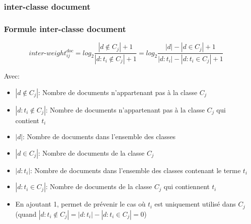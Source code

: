 \documentclass[12pt]{beamer}
\begin{document}
\begin{frame}
\subsubsection*{inter-classe document}
\frametitle{Formule inter-classe document}
 \begin{small}
 

\[ inter\mbox{-}weight_{ij}^{doc} = log_2 \frac{|d \notin{C_j}|+1}{|d:t_i \notin{C_j}|+1}= log_2 \frac{|d|-|d \in{C_j}|+1}{|d:t_i|-|d:t_i \in{C_j}|+1}\]
 \end{small}
 Avec:
 \begin{tiny}
\begin{itemize}
	\item $|d \notin  {C_j}|$: Nombre de documents n'appartenant pas à la classe $C_j$
	\item $|d:t_i \notin {C_j}|$: Nombre de documents n'appartenant pas à la classe $C_j$ qui contient $t_i$ 
	\item $|d|$: Nombre de documents dans l'ensemble des classes
	\item $|d \in  {C_j}|$: Nombre de documents de la classe $C_j$
	\item $|d:t_i|$: Nombre de documents dans l'ensemble des classes contenant le terme $t_i$ 
	\item $|d:t_i \in {C_j}|$: Nombre de documents de la classe $C_j$ qui contiennent $t_i$ 
	\item En ajoutant 1, permet de prévenir le cas où $t_i$ est uniquement utilisé dans $C_j$ (quand $|d:t_i \notin{C_j}|={|d:t_i|-|d:t_i \in{C_j}|} = 0$)
  \end{itemize}
 \end{tiny}
\end{frame}  
\end{document}
